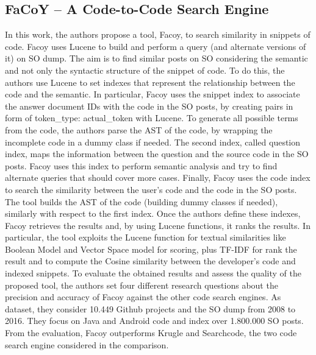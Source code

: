 \subsection{FaCoY – A Code-to-Code Search Engine}
In this work, the authors propose a tool, Facoy,  to search similarity in snippets of code. Facoy uses Lucene to build and perform a query (and alternate versions of it) on SO dump. The aim is to find similar posts on SO considering the semantic and not only the syntactic structure of the snippet of code.  To do this,  the authors use Lucene to set indexes that represent the relationship between the code and the semantic. In particular, Facoy uses the snippet index to associate the answer document IDs with the code in the SO posts, by creating pairs in form of token\_type: actual\_token with Lucene. To generate all possible terms from the code, the authors parse the AST of the code, by wrapping the incomplete code in a dummy class if needed. The second index, called question index, maps the information between the question and the source code in the SO posts. Facoy uses this index to perform semantic analysis and try to find alternate queries that should cover more cases. Finally, Facoy uses the code index to search the similarity between the user's code and the code in the SO posts.  The tool builds the AST of the code (building dummy classes if needed), similarly with respect to the first index. Once the authors define these indexes, Facoy retrieves the results and, by using Lucene functions, it ranks the results. In particular, the tool exploits the Lucene function for textual similarities like Boolean Model and Vector Space model for scoring, plus TF-IDF for rank the result and to compute the Cosine similarity between the developer's code and indexed snippets. To evaluate the obtained results and assess the quality of the proposed tool, the authors set four different research questions about the precision and accuracy of Facoy against the other code search engines. As dataset, they consider 10.449 Github projects and the SO dump from 2008 to 2016. They focus on Java and Android code and index over 1.800.000 SO posts. From the evaluation, Facoy outperforms Krugle and Searchcode, the two code search engine considered in the comparison. 

